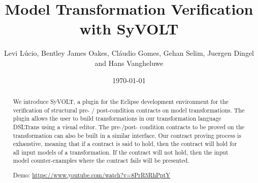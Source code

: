 \documentclass[conference]{IEEEtran}
\begin{document}
\title{Model Transformation Verification with SyVOLT}
\author{Levi L\'{u}cio, Bentley James Oakes, Cl\'{a}udio Gomes, Gehan Selim,
Juergen Dingel and Hans Vangheluwe}

\author{
	} 

\date{\today}


\maketitle 




\begin{abstract}
 
We introduce SyVOLT, a plugin for the Eclipse development environment for the
verification of structural pre- / post-condition contracts on model
transformations. The plugin allows the user to build transformations in our
transformation language DSLTrans using a visual editor. The pre-/post- condition
contracts to be proved on the transformation can also be built in a similar
interface. Our contract proving process is exhaustive, meaning that if a
contract is said to hold, then the contract will hold for all input models of a
transformation. If the contract will not hold, then the input model
counter-examples where the contract fails will be presented.

Demo: \url{https://www.youtube.com/watch?v=8PrR5RhPptY}



\end{abstract}
\end{document}
